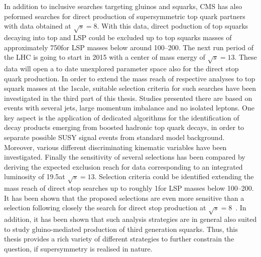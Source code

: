 In addition to inclusive searches targeting gluinos and squarks, CMS has also peformed searches for direct production of supersymmetric top quark partners with data obtained at $\sqrt{s} = 8$\tev. With this data, direct poduction of top squarks decaying into top and LSP could be excluded up to top squarks masses of approximately 750\gev for LSP masses below around 100--200\gev. The next run period of the LHC is going to start in 2015 with a center of mass energy of $\sqrt{s} = 13$\tev. These data will open a to date unexplored parameter space also for the direct stop quark production. In order to extend the mass reach of respective analyses to top squark masses at the 1\tev scale, suitable selection criteria for such searches have been investigated in the third part of this thesis. Studies presented there are based on events with several jets, large momentum imbalance and no isolated leptons. One key aspect is the application of dedicated algorithms for the identification of decay products emerging from boosted hadronic top quark decays, in order to separate possible SUSY signal events from standard model background. Moreover, various different discriminating kinematic variables have been investigated. Finally the sensitivity of several selections has been compared by deriving the expected exclusion reach for data corresponding to an integrated luminosity of 19.5\fbinv at $\sqrt{s} = 13$\tev. Selection criteria could be identified extending the mass reach of direct stop searches up to roughly 1\tev for LSP masses below 100--200\gev. It has been shown that the proposed selections are even more sensitive than a selection following closely the search for direct stop production at $\sqrt{s} = 8$\tev~\cite{CMS-PAS-SUS-13-015}. In addition, it has been shown that such analysis strategies are in general also suited to study gluino-mediated production of third generation squarks. Thus, this thesis provides a rich variety of different strategies to further constrain the question, if supersymmetry is realised in nature. 


